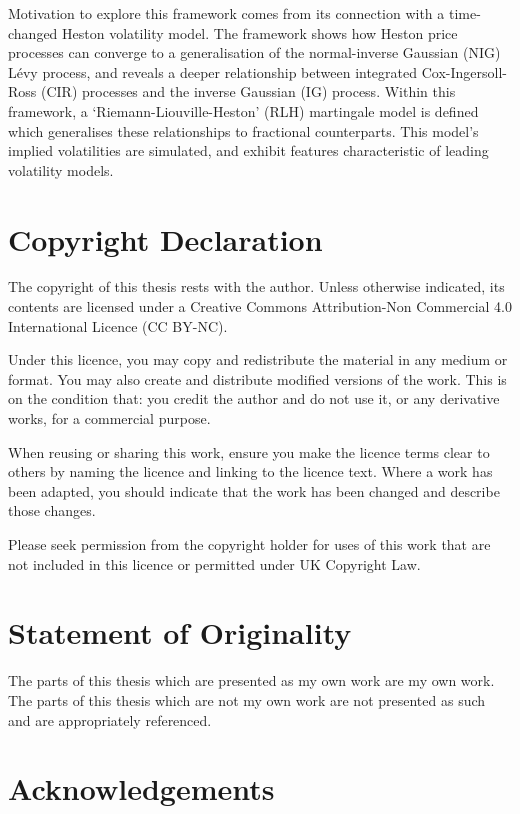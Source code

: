 Motivation to explore this framework comes from its connection with a time-changed Heston volatility model. The framework shows how Heston price processes can converge to a generalisation of the normal-inverse Gaussian (NIG) L\'evy process, and reveals a deeper relationship between integrated Cox-Ingersoll-Ross (CIR) processes and the inverse Gaussian (IG) process. Within this framework, a `Riemann-Liouville-Heston' (RLH) martingale model is defined which generalises these relationships to fractional counterparts. This model's implied volatilities are simulated, and exhibit features characteristic of leading volatility models.

\clearpage
\section*{Copyright Declaration}

The copyright of this thesis rests with the author. Unless otherwise
indicated, its contents are licensed under a Creative Commons
Attribution-Non Commercial 4.0 International Licence (CC BY-NC).

Under this licence, you may copy and redistribute the material in any
medium or format. You may also create and distribute modified
versions of the work. This is on the condition that: you credit the
author and do not use it, or any derivative works, for a commercial
purpose.

When reusing or sharing this work, ensure you make the licence
terms clear to others by naming the licence and linking to the licence
text. Where a work has been adapted, you should indicate that the
work has been changed and describe those changes.

Please seek permission from the copyright holder for uses of this
work that are not included in this licence or permitted under UK
Copyright Law.

\clearpage
\section*{Statement of Originality}

The parts of this thesis which are presented as my own work are my own work. The parts of this thesis which are not my own work are not presented as such and are appropriately referenced.

\clearpage
\section*{Acknowledgements}

